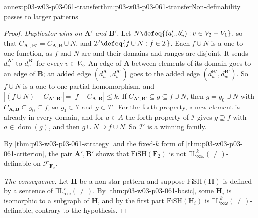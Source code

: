 \begin{annexitem}{annex:p03-w03-p03-061-transfer}{thm:p03-w03-p03-061-transfer}{Non-definability passes to larger patterns}
\begin{proof}
\emph{Duplicator wins on \(\mathbf A'\) and \(\mathbf B'\).} Let
\(N\defeq\{(a'_v,b'_v):v\in V_2-V_1\}\), so that
\(C_{\mathbf A',\mathbf B'}=C_{\mathbf A,\mathbf B}\cup N\), and
\(\mathcal I'\defeq\{f\cup N:f\in\mathcal I\}\). Each \(f\cup N\) is a
one-to-one function, as \(f\) and \(N\) are and their domains and ranges are
disjoint. It sends \(d_v^{\mathbf A'}\) to \(d_v^{\mathbf B'}\) for every
\(v\in V_2\). An edge of \(\mathbf A\) between elements of its domain goes to
an edge of \(\mathbf B\); an added edge \((d_u^{\mathbf A'},d_w^{\mathbf
A'})\) goes to the added edge \((d_u^{\mathbf B'},d_w^{\mathbf B'})\). So
\(f\cup N\) is a one-to-one partial homomorphism, and
\(|(f\cup N)-C_{\mathbf A',\mathbf B'}|=|f-C_{\mathbf A,\mathbf B}|\le k\).
If \(C_{\mathbf A',\mathbf B'}\subseteq g\subseteq f\cup N\), then
\(g=g_0\cup N\) with \(C_{\mathbf A,\mathbf B}\subseteq g_0\subseteq f\), so
\(g_0\in\mathcal I\) and \(g\in\mathcal I'\). For the forth property, a new
element is already in every domain, and for \(a\in A\) the forth property of
\(\mathcal I\) gives \(g\supseteq f\) with \(a\in\operatorname{dom}(g)\), and
then \(g\cup N\supseteq f\cup N\). So \(\mathcal I'\) is a winning family.

By \cref{thm:p03-w03-p03-061-strategy} and the fixed-\(k\) form of
\cref{thm:p03-w03-p03-061-criterion}, the pair \(\mathbf A',\mathbf B'\)
shows that \(\mathrm{FiSH}(\mathbf F_2)\) is not
\(\exists\mathrm L^k_{\infty\omega}(\neq)\)-definable on
\(\mathcal F_{\mathbf F_2}\).

\emph{The consequence.} Let \(\mathbf H\) be a non-star pattern and suppose
\(\mathrm{FiSH}(\mathbf H)\) is defined by a sentence of
\(\exists\mathrm L^k_{\infty\omega}(\neq)\). By
\cref{thm:p03-w03-p03-061-basic}, some \(\mathbf H_i\) is isomorphic to a
subgraph of \(\mathbf H\), and by the first part
\(\mathrm{FiSH}(\mathbf H_i)\) is
\(\exists\mathrm L^k_{\infty\omega}(\neq)\)-definable, contrary to the
hypothesis.
\end{proof}
\end{annexitem}

